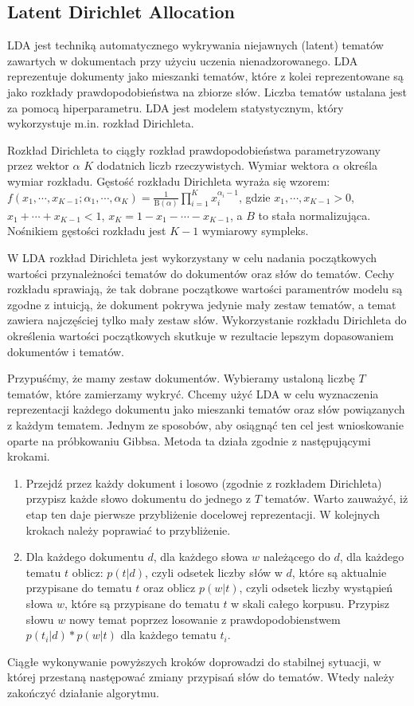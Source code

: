 \documentclass[pl]{minipw} %
\begin{document}
\subsection{Latent Dirichlet Allocation}

LDA\cite{lda} jest techniką automatycznego wykrywania niejawnych (latent) tematów zawartych w dokumentach przy użyciu uczenia nienadzorowanego. LDA reprezentuje dokumenty jako mieszanki tematów, które z kolei reprezentowane są jako rozkłady prawdopodobieństwa na zbiorze słów. Liczba tematów ustalana jest za pomocą hiperparametru. LDA jest modelem statystycznym, który wykorzystuje m.in. rozkład Dirichleta. 

Rozkład Dirichleta to ciągły rozkład prawdopodobieństwa parametryzowany przez wektor $\alpha$ $K$ dodatnich liczb rzeczywistych. Wymiar wektora $\alpha$ określa wymiar rozkładu. Gęstość rozkładu Dirichleta wyraża się wzorem: $ f\left(x_{1},\cdots ,x_{K-1};\alpha _{1},\cdots ,\alpha _{K}\right)={\frac {1}{\mathrm {B} (\alpha )}}\prod _{i=1}^{K}x_{i}^{\alpha _{i}-1}$, gdzie $ x_{1},\cdots ,x_{K-1}>0$, $x_{1}+\cdots +x_{K-1}<1$, $x_{K}=1-x_{1}-\cdots -x_{K-1}$, a $B$ to stała normalizująca. Nośnikiem gęstości rozkładu jest $K-1$ wymiarowy sympleks.

W LDA rozkład Dirichleta jest wykorzystany w celu nadania początkowych wartości przynależności tematów do dokumentów oraz słów do tematów. Cechy rozkładu sprawiają, że tak dobrane początkowe wartości paramentrów modelu są zgodne z intuicją, że dokument pokrywa jedynie mały zestaw tematów, a temat zawiera najczęściej tylko mały zestaw słów. Wykorzystanie rozkładu Dirichleta do określenia wartości początkowych skutkuje w rezultacie lepszym dopasowaniem dokumentów i tematów.

Przypuśćmy, że mamy zestaw dokumentów. Wybieramy ustaloną liczbę $T$ tematów, które zamierzamy wykryć. Chcemy użyć LDA w celu wyznaczenia reprezentacji każdego dokumentu jako mieszanki tematów oraz słów powiązanych z każdym tematem. Jednym ze sposobów, aby osiągnąć ten cel jest wnioskowanie oparte na próbkowaniu Gibbsa. Metoda ta działa zgodnie z następującymi krokami.

\begin{enumerate}
	\item Przejdź przez każdy dokument i losowo (zgodnie z rozkładem Dirichleta) przypisz każde słowo dokumentu do jednego z $T$ tematów.
	Warto zauważyć, iż etap ten daje pierwsze przybliżenie docelowej reprezentacji. W kolejnych krokach należy poprawiać to przybliżenie.
	\item Dla każdego dokumentu $d$, dla każdego słowa $w$ należącego do $d$, dla każdego tematu $t$ oblicz: $p(t | d)$, czyli odsetek liczby słów w $d$, które są aktualnie przypisane do tematu $t$ oraz oblicz $p(w | t)$, czyli odsetek liczby wystąpień słowa $w$, które są przypisane do tematu $t$ w skali całego korpusu. Przypisz słowu $w$ nowy temat poprzez losowanie z prawdopodobienstwem $p(t_i|d)*p(w|t)$ dla każdego tematu $t_i$.
\end{enumerate}
Ciągłe wykonywanie powyższych kroków doprowadzi do stabilnej sytuacji, w której przestaną następować zmiany przypisań słów do tematów. Wtedy należy zakończyć działanie algorytmu.
\end{document}
